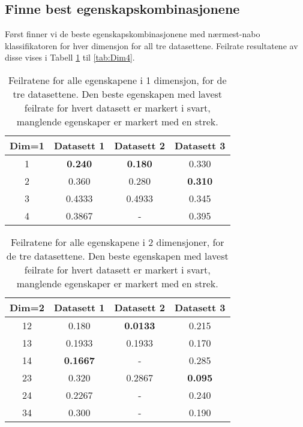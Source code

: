 \documentclass[twocolumn,norwegian]{article}
\begin{document}
\subsection{Finne best egenskapskombinasjonene}
Først finner vi de beste egenskapskombinasjonene med nærmest-nabo klassifikatoren for hver dimensjon for all tre datasettene. Feilrate resultatene av disse vises i Tabell \ref{tab:Dim1} til \ref{tab:Dim4}.
\begin{table}[h!]
	\centering
	\begin{tabular}{| c | c  c  c |}
		\hline
		\rule{0pt}{10pt}Dim=1 & Datasett 1 & Datasett 2 & Datasett 3 \\
		\hline
		\rule{0pt}{10pt}1 & \textbf{0.240} & \textbf{0.180} & 0.330 \\
		2 & 0.360 & 0.280 & \textbf{0.310} \\
		3 & 0.4333 & 0.4933 & 0.345 \\
		4 & 0.3867 & - & 0.395 \\
		\hline
	\end{tabular}
	\caption{Feilratene for alle egenskapene i 1 dimensjon, for de tre datasettene. Den beste egenskapen med lavest feilrate for hvert datasett er markert i svart, manglende egenskaper er markert med en strek.}
	\label{tab:Dim1}
\end{table}
\begin{table}[h!]
	\centering
	\begin{tabular}{| c | c  c  c |}
		\hline
		\rule{0pt}{10pt}Dim=2 & Datasett 1 & Datasett 2 & Datasett 3 \\
		\hline
		\rule{0pt}{10pt}12 & 0.180 & \textbf{0.0133} & 0.215 \\
		13 & 0.1933 & 0.1933 & 0.170 \\
		14 & \textbf{0.1667} & - & 0.285 \\
		23 & 0.320 & 0.2867 & \textbf{0.095} \\
		24 & 0.2267 & - & 0.240 \\
		34 & 0.300 & - & 0.190 \\
		\hline
	\end{tabular}
	\caption{Feilratene for alle egenskapene i 2 dimensjoner, for de tre datasettene. Den beste egenskapen med lavest feilrate for hvert datasett er markert i svart, manglende egenskaper er markert med en strek.}
	\label{tab:Dim2}
\end{table}
\end{document}
